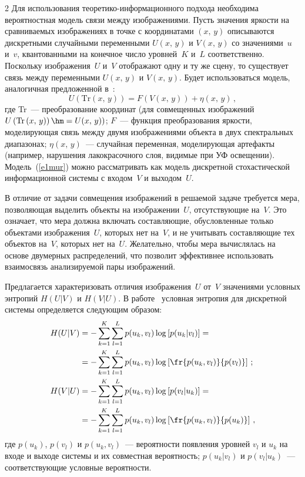 \begin{multicols}{2}
  Для использования теоретико-ин\-фор\-ма\-ци\-он\-но\-го подхода необходима 
вероятностная модель свя\-зи между изображениями. Пусть значения яр\-кости на 
сравниваемых изображениях в точке с координатами $(x,\,y)$ описываются дискретными 
случай\-ны\-ми переменными $U(x,\,y)$ и $V(x,\,y)$ со значениями~$u$ и~$v$, квантованными 
на конечное число уровней~$K$ и~$L$ соответственно. Поскольку изоб\-ра\-же\-ния~$U$ и~$V$ 
отображают одну и ту же сцену, то существует связь между переменными $U(x,\,y)$ и 
$V(x,\,y)$. Будет использоваться модель, аналогичная предложенной в~\cite{11mur}:
  \begin{equation}
  U\left(\mathrm{Tr}\left(x,\,y\right)\right) =F(V(x,\,y))+\eta(x,\,y)\,,
  \label{e1mur}
  \end{equation}
где Tr~--- преобразование координат (для совмещенных изображений 
$U\left(\mathrm{Tr}\left(x,\,y\right)\right)\hm=U(x,\,y))$; $F$~--- функция преобразования яркости, моделирующая связь 
между двумя изображениями объекта в двух спектральных диапазонах; $\eta(x,\,y)$~--- 
случайная переменная, моделирующая артефакты (например, нарушения лакокрасочного 
слоя, видимые при УФ освещении). Модель~(\ref{e1mur}) можно 
рассматривать как модель дискретной стохастической информационной системы с 
входом~$V$ и выходом~$U$. 
  
  В отличие от задачи совмещения изображений в решаемой задаче требуется мера, 
позволяющая выделить объекты на изображении~$U$, от\-сут\-ст\-ву\-ющие на~$V$. Это 
означает, что мера должна включать составляющие, обусловленные только объектами 
изображения~$U$, которых нет на~$V$, и не учитывать составляющие тех объектов на~$V$, 
которых нет на~$U$. Желательно, чтобы мера вычислялась на основе двумерных 
распределений, что позволит эффективнее использовать взаимосвязь анализируемой пары 
изображений.
  
  Предлагается характеризовать отличия изображения~$U$ от~$V$ значениями условных 
энтропий $H(U\vert V)$ и $H(V\vert U)$. В работе~\cite{14mur} условная энтропия 
для дискретной системы определяется следующим образом:
  \begin{align}
  H(U\vert V) &= -\sum\limits_{k=1}^K \sum\limits_{l=1}^L p(u_k,v_l)\log \left[ p(u_k\vert 
v_l)\right] ={}\notag\\
&{}=-\sum\limits_{k=1}^K \sum\limits_{l=1}^L p(u_k,v_l)\log 
\left[\fr{p(u_k,v_l)}{p(v_l)}\right]\,;\label{e2mur}\\
  H(V\vert U) &= -\sum\limits_{k=1}^K \sum\limits_{l=1}^L p(u_k,v_l)\log \left[ p(v_l\vert 
u_k)\right] ={}\notag\\
&{}=-\sum\limits_{k=1}^K \sum\limits_{l=1}^L p(u_k,v_l)\log 
\left[\fr{p(u_k,v_l)}{p(u_k)}\right]\,,\label{e3mur}
  \end{align}
где $p(u_k)$, $p(v_l)$ и $p(u_k,v_l)$~--- вероятности появления уровней $v_l$ и $u_k$ на 
входе и выходе системы и их совместная вероятность; $p(u_k\vert v_l)$ и 
$p(v_l\vert u_k)$~--- соответствующие 
условные вероятности.
  

\end{multicols}

